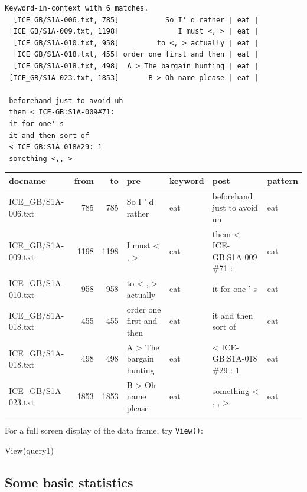 \documentclass[
  11pt,
  letterpaper,
  DIV=11,
  numbers=noendperiod]{scrreprt}
\newenvironment{Shaded}{\begin{snugshade}}{\end{snugshade}}
\newcommand{\FunctionTok}[1]{\textcolor[rgb]{0.28,0.35,0.67}{#1}}
\newcommand{\NormalTok}[1]{\textcolor[rgb]{0.00,0.23,0.31}{#1}}
\begin{document}
\begin{verbatim}
Keyword-in-context with 6 matches.                                                            
  [ICE_GB/S1A-006.txt, 785]           So I' d rather | eat |
 [ICE_GB/S1A-009.txt, 1198]              I must <, > | eat |
  [ICE_GB/S1A-010.txt, 958]         to <, > actually | eat |
  [ICE_GB/S1A-018.txt, 455] order one first and then | eat |
  [ICE_GB/S1A-018.txt, 498]  A > The bargain hunting | eat |
 [ICE_GB/S1A-023.txt, 1853]       B > Oh name please | eat |
                            
 beforehand just to avoid uh
 them < ICE-GB:S1A-009#71:  
 it for one' s              
 it and then sort of        
 < ICE-GB:S1A-018#29: 1     
 something <,, >            
\end{verbatim}

\begin{table}
\centering
\begin{tabular}[t]{l|r|r|l|l|l|l}
\hline
docname & from & to & pre & keyword & post & pattern\\
\hline
ICE\_GB/S1A-006.txt & 785 & 785 & So I ' d rather & eat & beforehand just to avoid uh & eat\\
\hline
ICE\_GB/S1A-009.txt & 1198 & 1198 & I must < , > & eat & them < ICE-GB:S1A-009 \#71 : & eat\\
\hline
ICE\_GB/S1A-010.txt & 958 & 958 & to < , > actually & eat & it for one ' s & eat\\
\hline
ICE\_GB/S1A-018.txt & 455 & 455 & order one first and then & eat & it and then sort of & eat\\
\hline
ICE\_GB/S1A-018.txt & 498 & 498 & A > The bargain hunting & eat & < ICE-GB:S1A-018 \#29 : 1 & eat\\
\hline
ICE\_GB/S1A-023.txt & 1853 & 1853 & B > Oh name please & eat & something < , , > & eat\\
\hline
\end{tabular}
\end{table}

For a full screen display of the data frame, try \texttt{View()}:

\begin{Shaded}
\begin{Highlighting}[]
\FunctionTok{View}\NormalTok{(query1)}
\end{Highlighting}
\end{Shaded}

\subsection{Some basic statistics}\label{some-basic-statistics}
\end{document}
